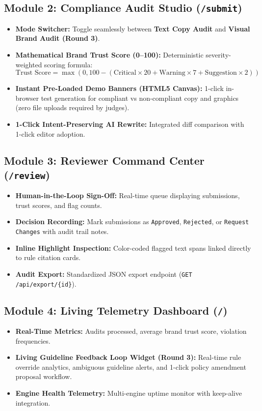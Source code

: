 \documentclass[11pt,a4paper]{article}
\begin{document}
\subsection{Module 2: Compliance Audit Studio (\texttt{/submit})}
\begin{itemize}[leftmargin=1cm]
    \item \textbf{Mode Switcher:} Toggle seamlessly between \textbf{Text Copy Audit} and \textbf{Visual Brand Audit (Round 3)}.
    \item \textbf{Mathematical Brand Trust Score (0--100):} Deterministic severity-weighted scoring formula:
    \begin{equation}
        \text{Trust Score} = \max\left(0, 100 - (\text{Critical} \times 20 + \text{Warning} \times 7 + \text{Suggestion} \times 2)\right)
    \end{equation}
    \item \textbf{Instant Pre-Loaded Demo Banners (HTML5 Canvas):} 1-click in-browser test generation for compliant vs non-compliant copy and graphics (zero file uploads required by judges).
    \item \textbf{1-Click Intent-Preserving AI Rewrite:} Integrated diff comparison with 1-click editor adoption.
\end{itemize}

\subsection{Module 3: Reviewer Command Center (\texttt{/review})}
\begin{itemize}[leftmargin=1cm]
    \item \textbf{Human-in-the-Loop Sign-Off:} Real-time queue displaying submissions, trust scores, and flag counts.
    \item \textbf{Decision Recording:} Mark submissions as \texttt{Approved}, \texttt{Rejected}, or \texttt{Request Changes} with audit trail notes.
    \item \textbf{Inline Highlight Inspection:} Color-coded flagged text spans linked directly to rule citation cards.
    \item \textbf{Audit Export:} Standardized JSON export endpoint (\texttt{GET /api/export/\{id\}}).
\end{itemize}

\subsection{Module 4: Living Telemetry Dashboard (\texttt{/})}
\begin{itemize}[leftmargin=1cm]
    \item \textbf{Real-Time Metrics:} Audits processed, average brand trust score, violation frequencies.
    \item \textbf{Living Guideline Feedback Loop Widget (Round 3):} Real-time rule override analytics, ambiguous guideline alerts, and 1-click policy amendment proposal workflow.
    \item \textbf{Engine Health Telemetry:} Multi-engine uptime monitor with keep-alive integration.
\end{itemize}
\end{document}
